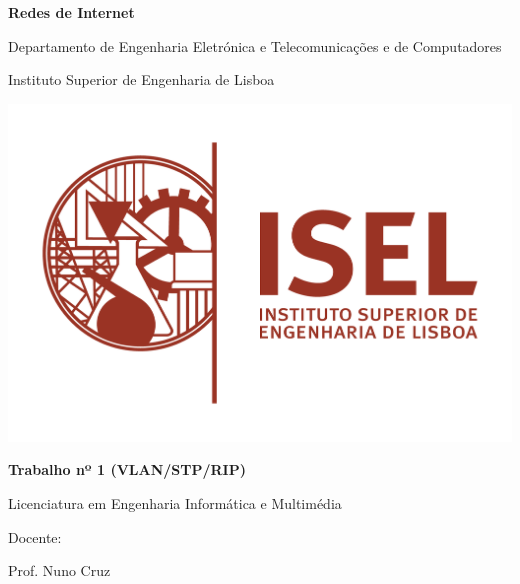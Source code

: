 \documentclass[11pt,english, openright, oneside]{book}
\begin{document}


\renewcommand{\contentsname}{Índice}

\begin{titlepage}
	\clearpage\thispagestyle{empty}
	\centering
	\vspace{1cm}

	{\Large \textbf{Redes de Internet}\par} {\Large Departamento de Engenharia
	Eletrónica e Telecomunicações e de Computadores \par} {\Large Instituto
	Superior de Engenharia de Lisboa \par}
		
	\vspace{0.5cm}
    
    \centering \includegraphics[scale=0.7]{imagens/isel.png}

	\vspace{1cm}
	
	{\Huge \textbf{Trabalho nº 1 (VLAN/STP/RIP)}} \\
	\vspace{1cm}

        {\Large Licenciatura em Engenharia Informática e Multimédia}
        
	\vspace{1cm}
	
	
	
	
	\begin{center}
	{\normalsize Docente: \par Prof. Nuno Cruz \\
	
}
\end{center}
\end{titlepage}
\end{document}
